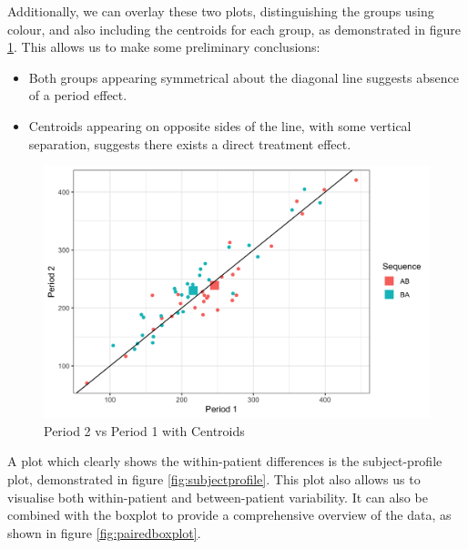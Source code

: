 \documentclass[12pt, TexShade, letterpaper]{report}
\begin{document}
Additionally, we can overlay these two plots, distinguishing the groups using colour, and also including the centroids for each group, as demonstrated in figure \ref{fig:centroids}. This allows us to make some preliminary conclusions:
\begin{itemize}
    \item Both groups appearing symmetrical about the diagonal line suggests absence of a period effect.
    \item Centroids appearing on opposite sides of the line, with some vertical separation, suggests there exists a direct treatment effect.
\end{itemize}

\begin{figure}[ht]
    \centering
    \includegraphics[width=0.85\linewidth]{report/figures/centroidsPlot.png}
    \caption{Period 2 vs Period 1 with Centroids}
    \label{fig:centroids}
\end{figure}

A plot which clearly shows the within-patient differences is the subject-profile plot, demonstrated in figure \ref{fig:subjectprofile}. This plot also allows us to visualise both within-patient and between-patient variability. It can also be combined with the boxplot to provide a comprehensive overview of the data, as shown in figure \ref{fig:pairedboxplot}.
\end{document}
